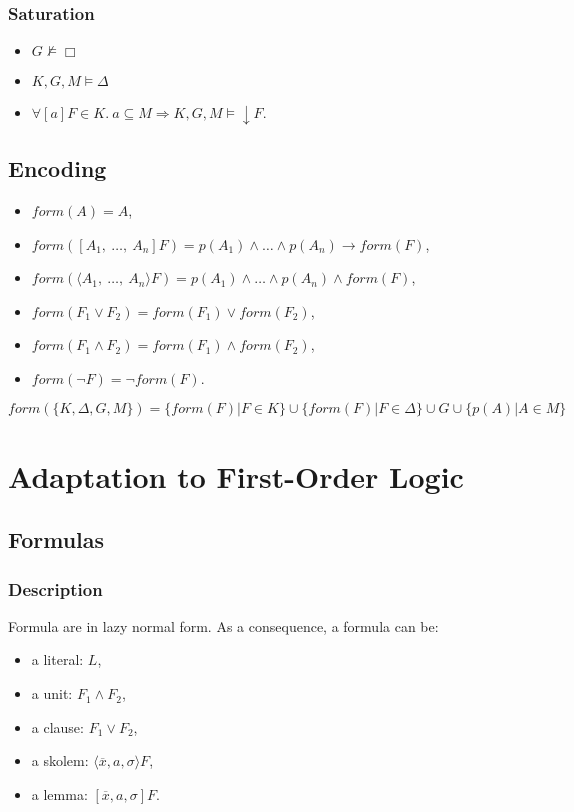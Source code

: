 \documentclass[a4paper,11pt]{article}
\newcommand{\F}{\mathit{form}}
\begin{document}
\subsubsection{Saturation}
\begin{itemize}
 \item $G\nvDash\Box$
 \item $K,G,M\vDash \Delta$
 \item $\forall [a]F\in K.\ a\subseteq M\Rightarrow K,G,M\vDash\downarrow F$.
\end{itemize}
\subsection{Encoding}
\begin{itemize}
 \item $\F(A)= A$,
 \item $\F([A_1,\ \dots,\ A_n]F)=p(A_1)\wedge\dots\wedge p(A_n)\rightarrow \F(F)$,
 \item $\F(\langle A_1,\ \dots,\ A_n\rangle F)= p(A_1)\wedge\dots\wedge p(A_n)\wedge \F(F)$,
 \item $\F(F_1\vee F_2)= \F(F_1)\vee \F(F_2)$,
 \item $\F(F_1\wedge F_2)= \F(F_1)\wedge \F(F_2)$,
 \item $\F(\neg F) = \neg \F(F)$.
\end{itemize}
$\F(\{K,\Delta,G,M\})=\{\F(F)|F\in K\}\cup\{\F(F)|F\in\Delta\}\cup G\cup\{p(A)|A\in M\}$
\section{Adaptation to First-Order Logic}
\subsection{Formulas}
\subsubsection{Description}
Formula are in lazy normal form. As a consequence, a formula can be:
\begin{itemize}
 \item a literal: $L$,
 \item a unit: $F_1\wedge F_2$,
 \item a clause: $F_1\vee F_2$,
 \item a skolem: $\langle\overline x,a,\sigma\rangle F$,
 \item a lemma: $[\overline x,a,\sigma]F$.
\end{itemize}
\end{document}
